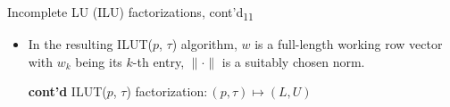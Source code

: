 \documentclass[t,usepdftitle=false]{beamer}
\begin{document}
\begin{frame}{Incomplete LU (ILU) factorizations, cont'd\textsubscript{11}}
\begin{itemize}
\item[] In the resulting ILUT($p$, $\tau$) algorithm, $w$ is a full-length working row vector with $w_k$ being its $k$-th entry, $\|\cdot\|$ is a suitably chosen norm.
\vspace{-.3cm}
\setcounter{algorithm}{11}
\begin{algorithm}[H]
\small
\caption{\textbf{cont'd} ILUT($p$, $\tau$) factorization$:(p,\tau)\mapsto (L,U)$}
\begin{algorithmic}[1]
\setcounter{ALC@line}{13}
\end{algorithmic}
\end{algorithm}
\end{itemize}
\end{frame}
\end{document}
